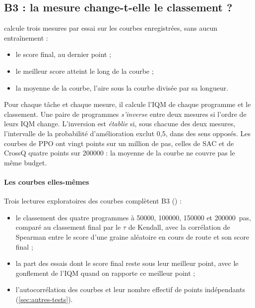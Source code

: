 \subsection{B3 : la mesure change-t-elle le classement ?}\label{sec:plan-b3}
 calcule trois mesures par essai sur les courbes enregistrées, sans aucun
entraînement :
\begin{itemize}
  \item le score final, au dernier point ;
  \item le meilleur score atteint le long de la courbe ;
  \item la moyenne de la courbe, l'aire sous la courbe divisée par sa longueur.
\end{itemize}
Pour chaque tâche et chaque mesure, il calcule l'IQM de chaque programme et le classement. Une paire de
programmes \emph{s'inverse} entre deux mesures si l'ordre de leurs IQM change. L'inversion est \emph{établie}
si, sous chacune des deux mesures, l'intervalle de la probabilité d'amélioration exclut 0,5, dans des sens
opposés. Les courbes de PPO ont vingt points sur un million de pas, celles de SAC et de CrossQ quatre points
sur \num{200000} : la moyenne de la courbe ne couvre pas le même budget.

\paragraph{Les courbes elles-mêmes}
Trois lectures exploratoires des courbes complètent B3
() :
\begin{itemize}
  \item le classement des quatre programmes à \num{50000}, \num{100000}, \num{150000} et \num{200000}~pas,
    comparé au classement final par le $\tau$ de Kendall, avec la corrélation de Spearman entre le score d'une
    graine aléatoire en cours de route et son score final ;
  \item la part des essais dont le score final reste sous leur meilleur point, avec le gonflement de l'IQM
    quand on rapporte ce meilleur point ;
  \item l'autocorrélation des courbes et leur nombre effectif de points indépendants (\cref{sec:autres-tests}).
\end{itemize}

